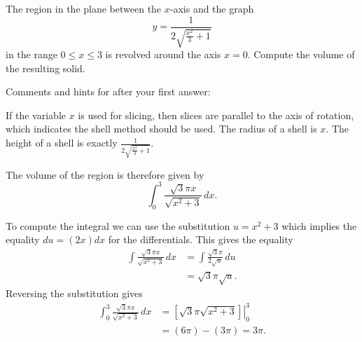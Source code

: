 \documentclass{ximera}
\begin{document}
\begin{question}%

The region in the plane between the  \(x\)-axis and the graph
\[ y = \frac{1}{2 \sqrt{\frac{x^{2}}{3} + 1}} \]
 in the range \(0 \leq x \leq 3\) is revolved around the axis \(x = 0\). Compute the volume of the resulting solid.
\begin{multiplechoice}
\choice{\(\displaystyle 2 \pi\)}
\choice[correct]{\(\displaystyle 3 \pi\)}
\choice{\(\displaystyle 5 \pi\)}
\end{multiplechoice}
Comments and hints for after your first answer:
\begin{feedback}
If the variable \(x\) is used for slicing, then slices are parallel to the axis of rotation, which indicates the shell method should be used.
The radius of a shell is \(x\). The height of a shell is exactly \(\frac{1}{2 \sqrt{\frac{x^{2}}{3} + 1}}\).
\begin{hint}
The volume of the region is therefore given by
\[ \int_{0}^{3} \frac{\sqrt{3} \pi x}{\sqrt{x^{2} + 3}}\, dx. \]
\begin{hint}
 To compute the integral we can use the substitution \(u = x^{2} + 3\) which implies the equality \(du = \left(2 x\right)dx\) for the differentials. This gives the equality
\[ \begin{aligned} \int \frac{\sqrt{3} \pi x}{\sqrt{x^{2} + 3}}\, dx & = \int \frac{\sqrt{3} \pi}{2 \sqrt{u}}\, du \\
 & = \sqrt{3} \pi \sqrt{u}. \end{aligned} \]
Reversing the substitution gives
\[ \begin{aligned} \int_{0}^{3} \frac{\sqrt{3} \pi x}{\sqrt{x^{2} + 3}}\, dx & = \left. \left[\sqrt{3} \pi \sqrt{x^{2} + 3} \right] \right|_{0}^{3}\\ & = \left(6 \pi \right) - \left(3 \pi \right) = 3 \pi. \end{aligned} \]
\end{hint}
\end{hint}
\end{feedback}

\end{question}
\end{document}
